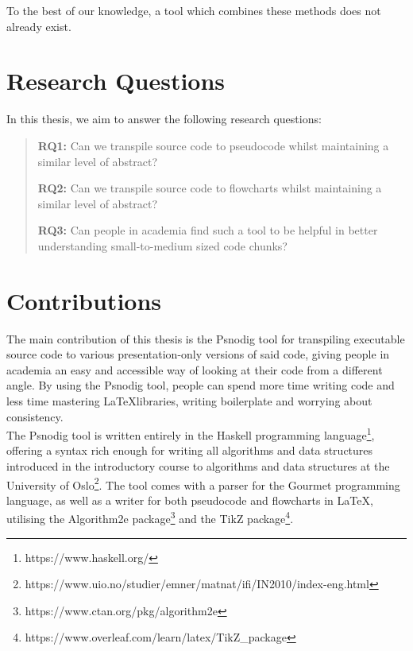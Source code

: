 To the best of our knowledge, a tool which combines these methods does not already exist.

\section{Research Questions}

In this thesis, we aim to answer the following research questions: \hfill \\

\begin{quote}
    \textbf{RQ1:} Can we transpile source code to pseudocode whilst maintaining a similar level of abstract?

    \textbf{RQ2:} Can we transpile source code to flowcharts whilst maintaining a similar level of abstract?

    \textbf{RQ3:} Can people in academia find such a tool to be helpful in better understanding small-to-medium sized code chunks?
\end{quote}


\section{Contributions}

The main contribution of this thesis is the Psnodig tool for transpiling executable source code to various presentation-only versions of said code, giving people in academia an easy and accessible way of looking at their code from a different angle. By using the Psnodig tool, people can spend more time writing code and less time mastering \LaTeX libraries, writing boilerplate and worrying about consistency. \hfill \\

The Psnodig tool is written entirely in the Haskell programming language\footnote{https://www.haskell.org/}, offering a syntax rich enough for writing all algorithms and data structures introduced in the introductory course to algorithms and data structures at the University of Oslo\footnote{https://www.uio.no/studier/emner/matnat/ifi/IN2010/index-eng.html}. The tool comes with a parser for the Gourmet programming language, as well as a writer for both pseudocode and flowcharts in \LaTeX, utilising the Algorithm2e package\footnote{https://www.ctan.org/pkg/algorithm2e} and the TikZ package\footnote{https://www.overleaf.com/learn/latex/TikZ\_package}. \hfill \\

